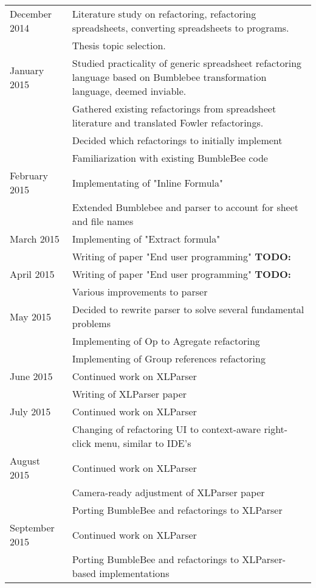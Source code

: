 \documentclass[12pt,a4paper,onecolumn,oneside]{memoir}
\newcommand{\todo}[1]{\textbf{TODO: #1}}
\begin{document}
\begin{tabularx}{\textwidth}{lX}
\toprule
December 2014 & Literature study on refactoring, refactoring spreadsheets, converting spreadsheets to programs. \\
& Thesis topic selection. \\
January 2015 & Studied practicality of generic spreadsheet refactoring language based on Bumblebee transformation language, deemed inviable. \\
& Gathered existing refactorings from spreadsheet literature and translated Fowler refactorings. \\
& Decided which refactorings to initially implement \\
& Familiarization with existing BumbleBee code \\
February 2015 & Implementating of "Inline Formula" \\
& Extended Bumblebee and parser to account for sheet and file names \\
March 2015 & Implementing of "Extract formula" \\
& Writing of paper "End user programming" \todo{} \\
April 2015 & Writing of paper "End user programming" \todo{} \\
& Various improvements to parser \\
May 2015 & Decided to rewrite parser to solve several fundamental problems \\
& Implementing of Op to Agregate refactoring \\
& Implementing of Group references refactoring \\
June 2015 & Continued work on XLParser \\
& Writing of XLParser paper \\
July 2015 & Continued work on XLParser \\
& Changing of refactoring UI to context-aware right-click menu, similar to IDE's \\
August 2015 & Continued work on XLParser \\
& Camera-ready adjustment of XLParser paper \\
& Porting BumbleBee and refactorings to XLParser \\
September 2015 & Continued work on XLParser \\
& Porting BumbleBee and refactorings to XLParser-based implementations \\
\bottomrule
\end{tabularx}
\end{document}
